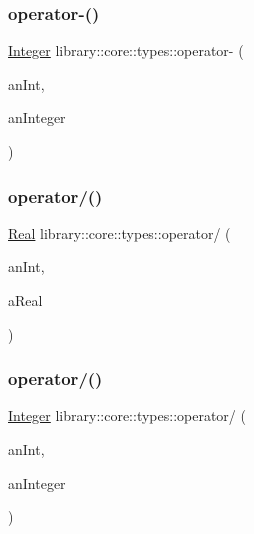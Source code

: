 \subsubsection{\texorpdfstring{operator-\/()}{operator-()}\hspace{0.1cm}{\footnotesize\ttfamily [2/2]}}
{\footnotesize\ttfamily \hyperlink{classlibrary_1_1core_1_1types_1_1Integer}{Integer} library\+::core\+::types\+::operator-\/ (\begin{DoxyParamCaption}\item[{const \hyperlink{classlibrary_1_1core_1_1types_1_1Integer_a623afb1580f870fd8a1997b1c12c917d}{Integer\+::\+Value\+Type} \&}]{an\+Int,  }\item[{const \hyperlink{classlibrary_1_1core_1_1types_1_1Integer}{Integer} \&}]{an\+Integer }\end{DoxyParamCaption})}

\mbox{\label{namespacelibrary_1_1core_1_1types_a658c106fe2c6306de5469a586c287bc2}} 
\subsubsection{\texorpdfstring{operator/()}{operator/()}\hspace{0.1cm}{\footnotesize\ttfamily [1/2]}}
{\footnotesize\ttfamily \hyperlink{classlibrary_1_1core_1_1types_1_1Real}{Real} library\+::core\+::types\+::operator/ (\begin{DoxyParamCaption}\item[{const \hyperlink{classlibrary_1_1core_1_1types_1_1Real_a9c5c8826b7e5a8e39544d23fea6c0e1c}{Real\+::\+Value\+Type} \&}]{an\+Int,  }\item[{const \hyperlink{classlibrary_1_1core_1_1types_1_1Real}{Real} \&}]{a\+Real }\end{DoxyParamCaption})}

\mbox{\label{namespacelibrary_1_1core_1_1types_af520df27ed5123ce801e1d397bfd3234}} 
\subsubsection{\texorpdfstring{operator/()}{operator/()}\hspace{0.1cm}{\footnotesize\ttfamily [2/2]}}
{\footnotesize\ttfamily \hyperlink{classlibrary_1_1core_1_1types_1_1Integer}{Integer} library\+::core\+::types\+::operator/ (\begin{DoxyParamCaption}\item[{const \hyperlink{classlibrary_1_1core_1_1types_1_1Integer_a623afb1580f870fd8a1997b1c12c917d}{Integer\+::\+Value\+Type} \&}]{an\+Int,  }\item[{const \hyperlink{classlibrary_1_1core_1_1types_1_1Integer}{Integer} \&}]{an\+Integer }\end{DoxyParamCaption})}

